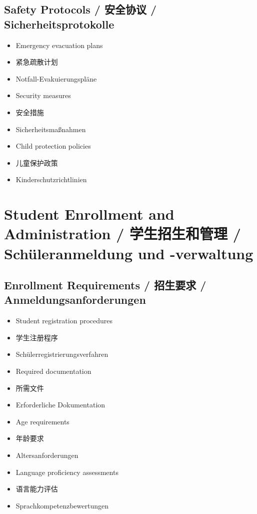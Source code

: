 \subsection{Safety Protocols / 安全协议 / Sicherheitsprotokolle}
\begin{itemize}
    \item Emergency evacuation plans
    \item 紧急疏散计划
    \item Notfall-Evakuierungspläne
    \item Security measures
    \item 安全措施
    \item Sicherheitsmaßnahmen
    \item Child protection policies
    \item 儿童保护政策
    \item Kinderschutzrichtlinien
\end{itemize}

\section{Student Enrollment and Administration / 学生招生和管理 / Schüleranmeldung und -verwaltung}

\subsection{Enrollment Requirements / 招生要求 / Anmeldungsanforderungen}
\begin{itemize}
    \item Student registration procedures
    \item 学生注册程序
    \item Schülerregistrierungsverfahren
    \item Required documentation
    \item 所需文件
    \item Erforderliche Dokumentation
    \item Age requirements
    \item 年龄要求
    \item Altersanforderungen
    \item Language proficiency assessments
    \item 语言能力评估
    \item Sprachkompetenzbewertungen
\end{itemize}

